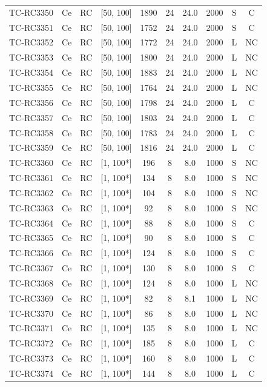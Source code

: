 \begin{longtable}{lccccccccc}
TC-RC3350 & Ce & RC & [50, 100] & 1890 & 24 & 24.0 & 2000 & S & C \\
TC-RC3351 & Ce & RC & [50, 100] & 1752 & 24 & 24.0 & 2000 & S & C \\
TC-RC3352 & Ce & RC & [50, 100] & 1772 & 24 & 24.0 & 2000 & L & NC \\
TC-RC3353 & Ce & RC & [50, 100] & 1800 & 24 & 24.0 & 2000 & L & NC \\
TC-RC3354 & Ce & RC & [50, 100] & 1883 & 24 & 24.0 & 2000 & L & NC \\
TC-RC3355 & Ce & RC & [50, 100] & 1764 & 24 & 24.0 & 2000 & L & NC \\
TC-RC3356 & Ce & RC & [50, 100] & 1798 & 24 & 24.0 & 2000 & L & C \\
TC-RC3357 & Ce & RC & [50, 100] & 1803 & 24 & 24.0 & 2000 & L & C \\
TC-RC3358 & Ce & RC & [50, 100] & 1783 & 24 & 24.0 & 2000 & L & C \\
TC-RC3359 & Ce & RC & [50, 100] & 1816 & 24 & 24.0 & 2000 & L & C \\
TC-RC3360 & Ce & RC & [1, 100*] & 196 & 8 & 8.0 & 1000 & S & NC \\
TC-RC3361 & Ce & RC & [1, 100*] & 134 & 8 & 8.0 & 1000 & S & NC \\
TC-RC3362 & Ce & RC & [1, 100*] & 104 & 8 & 8.0 & 1000 & S & NC \\
TC-RC3363 & Ce & RC & [1, 100*] & 92 & 8 & 8.0 & 1000 & S & NC \\
TC-RC3364 & Ce & RC & [1, 100*] & 88 & 8 & 8.0 & 1000 & S & C \\
TC-RC3365 & Ce & RC & [1, 100*] & 90 & 8 & 8.0 & 1000 & S & C \\
TC-RC3366 & Ce & RC & [1, 100*] & 124 & 8 & 8.0 & 1000 & S & C \\
TC-RC3367 & Ce & RC & [1, 100*] & 130 & 8 & 8.0 & 1000 & S & C \\
TC-RC3368 & Ce & RC & [1, 100*] & 124 & 8 & 8.0 & 1000 & L & NC \\
TC-RC3369 & Ce & RC & [1, 100*] & 82 & 8 & 8.1 & 1000 & L & NC \\
TC-RC3370 & Ce & RC & [1, 100*] & 86 & 8 & 8.0 & 1000 & L & NC \\
TC-RC3371 & Ce & RC & [1, 100*] & 135 & 8 & 8.0 & 1000 & L & NC \\
TC-RC3372 & Ce & RC & [1, 100*] & 185 & 8 & 8.0 & 1000 & L & C \\
TC-RC3373 & Ce & RC & [1, 100*] & 160 & 8 & 8.0 & 1000 & L & C \\
TC-RC3374 & Ce & RC & [1, 100*] & 144 & 8 & 8.0 & 1000 & L & C \\

\end{longtable}

